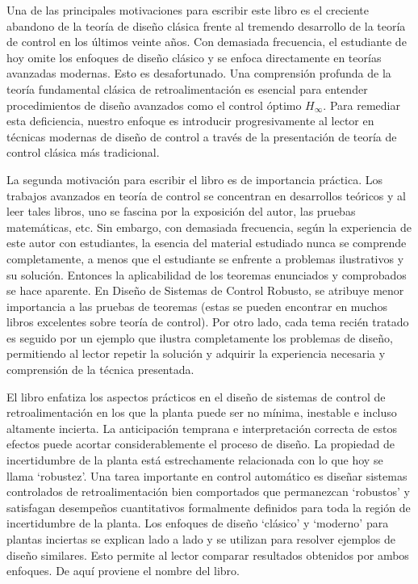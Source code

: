 \documentclass[
	spanish, %
	letterpaper, oneside
]{book}
\begin{document}
\templatePortrait

\templatePagecfg

\begin{abstractd}
	Una de las principales motivaciones para escribir este libro es el creciente abandono de la teoría de diseño clásica frente al tremendo desarrollo de la teoría de control en los últimos veinte años. Con demasiada frecuencia, el estudiante de hoy omite los enfoques de diseño clásico y se enfoca directamente en teorías avanzadas modernas. Esto es desafortunado. Una comprensión profunda de la teoría fundamental clásica de retroalimentación es esencial para entender procedimientos de diseño avanzados como el control óptimo $H_{\infty}$. Para remediar esta deficiencia, nuestro enfoque es introducir progresivamente al lector en técnicas modernas de diseño de control a través de la presentación de teoría de control clásica más tradicional.

	La segunda motivación para escribir el libro es de importancia práctica. Los trabajos avanzados en teoría de control se concentran en desarrollos teóricos y al leer tales libros, uno se fascina por la exposición del autor, las pruebas matemáticas, etc. Sin embargo, con demasiada frecuencia, según la experiencia de este autor con estudiantes, la esencia del material estudiado nunca se comprende completamente, a menos que el estudiante se enfrente a problemas ilustrativos y su solución. Entonces la aplicabilidad de los teoremas enunciados y comprobados se hace aparente. En Diseño de Sistemas de Control Robusto, se atribuye menor importancia a las pruebas de teoremas (estas se pueden encontrar en muchos libros excelentes sobre teoría de control). Por otro lado, cada tema recién tratado es seguido por un ejemplo que ilustra completamente los problemas de diseño, permitiendo al lector repetir la solución y adquirir la experiencia necesaria y comprensión de la técnica presentada.

	El libro enfatiza los aspectos prácticos en el diseño de sistemas de control de retroalimentación en los que la planta puede ser no mínima, inestable e incluso altamente incierta. La anticipación temprana e interpretación correcta de estos efectos puede acortar considerablemente el proceso de diseño. La propiedad de incertidumbre de la planta está estrechamente relacionada con lo que hoy se llama `robustez'. Una tarea importante en control automático es diseñar sistemas controlados de retroalimentación bien comportados que permanezcan `robustos' y satisfagan desempeños cuantitativos formalmente definidos para toda la región de incertidumbre de la planta. Los enfoques de diseño `clásico' y `moderno' para plantas inciertas se explican lado a lado y se utilizan para resolver ejemplos de diseño similares. Esto permite al lector comparar resultados obtenidos por ambos enfoques. De aquí proviene el nombre del libro.


\end{abstractd}
\end{document}
